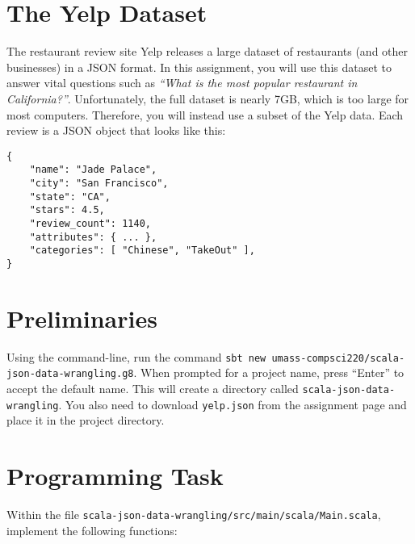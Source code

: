 \documentclass[9pt]{extbook}
\begin{document}
\section{The Yelp Dataset}

The restaurant review site Yelp releases a large dataset of restaurants
(and other businesses) in a
JSON format. In this assignment, you will use this dataset to answer vital
questions such as \emph{``What is the most popular restaurant in
California?''}. Unfortunately, the full dataset is nearly 7GB, which is too
large for most computers. Therefore, you will instead use a subset of the Yelp
data. Each review is a JSON object that looks like this:
\begin{lstlisting}
{
    "name": "Jade Palace",
    "city": "San Francisco",
    "state": "CA",
    "stars": 4.5,
    "review_count": 1140,
    "attributes": { ... },
    "categories": [ "Chinese", "TakeOut" ],
}
\end{lstlisting}

\section{Preliminaries}

Using the command-line, run the command
\verb|sbt new umass-compsci220/scala-json-data-wrangling.g8|. When prompted for
a project name, press ``Enter'' to accept the default name. This will create
a directory called \verb|scala-json-data-wrangling|.
You also need to download \verb|yelp.json| from the assignment page
and place it in the project directory.


\section{Programming Task}


Within the file \verb|scala-json-data-wrangling/src/main/scala/Main.scala|,
implement the following functions:
\end{document}
